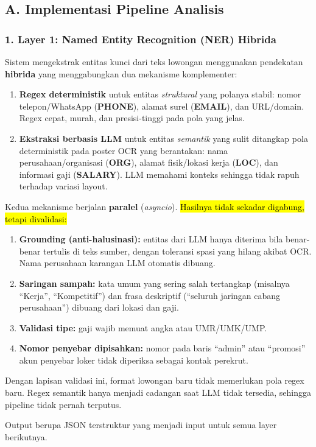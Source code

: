 \documentclass[12pt,a4paper]{article}
\newcommand{\revisi}[1]{\hl{#1}}
\newenvironment{sorotkuning}{%
  \begin{tcolorbox}[
    breakable,
    enhanced,
    frame hidden,
    boxrule=0pt,
    arc=0mm,
    sharp corners,
    colback=yellow!22,
    left=1.5mm, right=1.5mm, top=1.0mm, bottom=1.0mm,
    before skip=1.5pt, after skip=1.5pt
  ]%
}{%
  \end{tcolorbox}%
}
\begin{document}
\subsection*{A. Implementasi Pipeline Analisis}

\subsubsection*{1. Layer 1: Named Entity Recognition (NER) Hibrida}

Sistem mengekstrak entitas kunci dari teks lowongan menggunakan pendekatan \textbf{hibrida}
yang menggabungkan dua mekanisme komplementer:

\begin{enumerate}[label=\textbf{\alph*.}, leftmargin=*, labelindent=0.65cm, labelsep=0.5em]
\item \textbf{Regex deterministik} untuk entitas \emph{struktural} yang polanya stabil:
      nomor telepon/WhatsApp (\textbf{PHONE}), alamat surel (\textbf{EMAIL}), dan URL/domain.
      Regex cepat, murah, dan presisi-tinggi pada pola yang jelas.
\item \textbf{Ekstraksi berbasis LLM} untuk entitas \emph{semantik} yang sulit ditangkap pola
      deterministik pada poster OCR yang berantakan: nama perusahaan/organisasi (\textbf{ORG}),
      alamat fisik/lokasi kerja (\textbf{LOC}), dan informasi gaji (\textbf{SALARY}).
      LLM memahami konteks sehingga tidak rapuh terhadap variasi layout.
\end{enumerate}

Kedua mekanisme berjalan \textbf{paralel} (\textit{asyncio}). \revisi{Hasilnya tidak sekadar digabung, tetapi divalidasi:}
\begin{sorotkuning}
\begin{enumerate}[label=\textbf{\roman*.}, leftmargin=*]
\item \textbf{Grounding (anti-halusinasi):} entitas dari LLM hanya diterima bila benar-benar tertulis di teks sumber,
      dengan toleransi spasi yang hilang akibat OCR. Nama perusahaan karangan LLM otomatis dibuang.
\item \textbf{Saringan sampah:} kata umum yang sering salah tertangkap (misalnya ``Kerja'', ``Kompetitif'') dan frasa
      deskriptif (``seluruh jaringan cabang perusahaan'') dibuang dari lokasi dan gaji.
\item \textbf{Validasi tipe:} gaji wajib memuat angka atau UMR/UMK/UMP.
\item \textbf{Nomor penyebar dipisahkan:} nomor pada baris ``admin'' atau ``promosi'' akun penyebar loker tidak
      diperiksa sebagai kontak perekrut.
\end{enumerate}
Dengan lapisan validasi ini, format lowongan baru tidak memerlukan pola regex baru. Regex semantik hanya
menjadi cadangan saat LLM tidak tersedia, sehingga pipeline tidak pernah terputus.
\end{sorotkuning} Output berupa JSON terstruktur yang menjadi input untuk semua
layer berikutnya.
\end{document}
